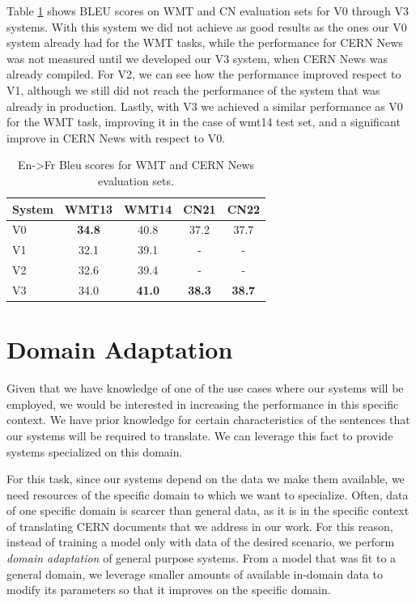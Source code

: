\documentclass[11pt,english,listoffigures,listoftables]{tfgetsinf}
\begin{document}
Table \ref{table:bleuoff} shows BLEU scores on WMT and CN evaluation sets for V0 through V3 systems.
With this system we did not achieve as good results as the ones our V0 system already had for the WMT tasks, while the performance for CERN News was not measured until we developed our V3 system, when CERN News was already compiled. 
For V2, we can see how the performance improved respect to V1, although we still did not reach the performance of the system that was already in production. 
Lastly, with V3 we achieved a similar performance as V0 for the WMT task, improving it in the case of wmt14 test set, and a significant improve in CERN News with respect to V0.

\begin{table}
\caption{En->Fr Bleu scores for WMT and CERN News evaluation sets.}
\centering
\begin{tabular}{l|c|c|c|c}\label{transformer:wmt:r}
System & WMT13 & WMT14 & CN21 & CN22 \\
\hline
V0 & \textbf{34.8} & 40.8 & 37.2 & 37.7\\
V1 & 32.1 & 39.1 & - & - \\
V2 & 32.6 & 39.4 & - & - \\
V3 & 34.0 & \textbf{41.0} & \textbf{38.3} & \textbf{38.7}\\
\end{tabular}
\label{table:bleuoff}
\end{table}





\chapter{Domain Adaptation}\label{domad}
Given that we have knowledge of one of the use cases where our systems will be employed, we would be interested in increasing the performance in this specific context.
We have prior knowledge for certain characteristics of the sentences that our systems will be required to translate. We can leverage this fact to provide systems specialized on this domain.

For this task, since our systems depend on the data we make them available, we need resources of the specific domain to which we want to specialize. Often, data of one specific domain is scarcer than general data, as it is in the specific context of translating CERN documents that we address in our work. For this reason, instead of training a model only with data of the desired scenario, we perform \textit{domain adaptation} of general purpose systems. From a model that was fit to a general domain, we leverage smaller amounts of available in-domain data to modify its parameters so that it improves on the specific domain. 
\end{document}
